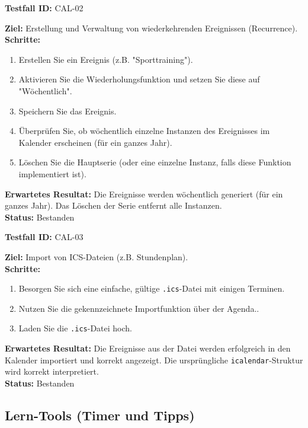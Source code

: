 \documentclass[11pt, a4paper]{article}
\newenvironment{testcase}[1]{%
    \par\vspace{1em}\noindent\begin{minipage}{\linewidth}
    \textbf{Testfall ID:} #1 \\
    \vspace{0.2em}
}{\end{minipage}\par\vspace{1em}}
\begin{document}
\begin{testcase}{CAL-02}
    \textbf{Ziel:} Erstellung und Verwaltung von wiederkehrenden Ereignissen (Recurrence).\\
    \textbf{Schritte:}
    \begin{enumerate}[label=\arabic*.]
        \item Erstellen Sie ein Ereignis (z.B. "Sporttraining").
        \item Aktivieren Sie die Wiederholungsfunktion und setzen Sie diese auf "Wöchentlich".
        \item Speichern Sie das Ereignis.
        \item Überprüfen Sie, ob wöchentlich einzelne Instanzen des Ereignisses im Kalender erscheinen (für ein ganzes Jahr).
        \item Löschen Sie die Hauptserie (oder eine einzelne Instanz, falls diese Funktion implementiert ist).
    \end{enumerate}
    \textbf{Erwartetes Resultat:} Die Ereignisse werden wöchentlich generiert (für ein ganzes Jahr). Das Löschen der Serie entfernt alle Instanzen.\\
    \vspace{0.5em}\textbf{Status:} \textcolor{passcolor}{Bestanden}
\end{testcase}

\begin{testcase}{CAL-03}
    \textbf{Ziel:} Import von ICS-Dateien (z.B. Stundenplan).\\
    \textbf{Schritte:}
    \begin{enumerate}[label=\arabic*.]
        \item Besorgen Sie sich eine einfache, gültige \texttt{.ics}-Datei mit einigen Terminen.
        \item Nutzen Sie die gekennzeichnete Importfunktion über der Agenda..
        \item Laden Sie die \texttt{.ics}-Datei hoch.
    \end{enumerate}
    \textbf{Erwartetes Resultat:} Die Ereignisse aus der Datei werden erfolgreich in den Kalender importiert und korrekt angezeigt. Die ursprüngliche \texttt{icalendar}-Struktur wird korrekt interpretiert.\\
    \vspace{0.5em}\textbf{Status:} \textcolor{passcolor}{Bestanden}
\end{testcase}

\subsection{Lern-Tools (Timer und Tipps)}
\end{document}
